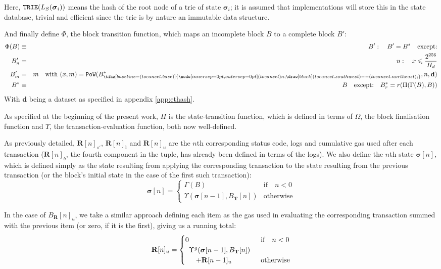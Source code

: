 \documentclass[9pt,oneside]{amsart}
\newcommand{\hcancel}[1]{%
    \tikz[baseline=(tocancel.base)]{
        \node[inner sep=0pt,outer sep=0pt] (tocancel) {#1};
        \draw[black] (tocancel.south west) -- (tocancel.north east);
    }%
}%
\begin{document}
\begin{multicols}{2}
Here, $\mathtt{\small TRIE}(L_S(\boldsymbol{\sigma}_i))$ means the hash of the root node of a trie of state $\boldsymbol{\sigma}_i$; it is assumed that implementations will store this in the state database, trivial and efficient since the trie is by nature an immutable data structure.

And finally define $\Phi$, the block transition function, which maps an incomplete block $B$ to a complete block $B'$:
\begin{eqnarray}
\Phi(B) & \equiv & B': \quad B' = B^* \quad \text{except:} \\
B'_n & = & n: \quad x \leqslant \frac{2^{256}}{H_d} \\
B'_m & = & m \quad \text{with } (x, m) = \mathtt{PoW}(B^*_{\hcancel{n}}, n, \mathbf{d}) \\
B^* & \equiv & B \quad \text{except:} \quad B^*_r = r(\Pi(\Gamma(B), B))
\end{eqnarray}
With $\mathbf{d}$ being a dataset as specified in appendix \ref{app:ethash}.

As specified at the beginning of the present work, $\Pi$ is the state-transition function, which is defined in terms of $\Omega$, the block finalisation function and $\Upsilon$, the transaction-evaluation function, both now well-defined.

As previously detailed, $\mathbf{R}[n]_{s'}$, $\mathbf{R}[n]_\mathbf{l}$ and $\mathbf{R}[n]_u$ are the $n$th corresponding status code, logs and cumulative gas used after each transaction ($\mathbf{R}[n]_b$, the fourth component in the tuple, has already been defined in terms of the logs). We also define the $n$th state $\boldsymbol{\sigma}[n]$, which is defined simply as the state resulting from applying the corresponding transaction to the state resulting from the previous transaction (or the block's initial state in the case of the first such transaction):
\begin{equation}
\boldsymbol{\sigma}[n] = \begin{cases} \Gamma(B) & \text{if} \quad n < 0 \\ \Upsilon(\boldsymbol{\sigma}[n - 1], B_\mathbf{T}[n]) & \text{otherwise} \end{cases}
\end{equation}

In the case of $B_\mathbf{R}[n]_u$, we take a similar approach defining each item as the gas used in evaluating the corresponding transaction summed with the previous item (or zero, if it is the first), giving us a running total:
\begin{equation}
\mathbf{R}[n]_u = \begin{cases} 0 & \text{if} \quad n < 0 \\
\begin{array}[b]{l}
\Upsilon^g(\boldsymbol{\sigma}[n - 1], B_\mathbf{T}[n])\\ \quad + \mathbf{R}[n-1]_u
\end{array}
 & \text{otherwise} \end{cases}
\end{equation}


\end{multicols}
\end{document}
